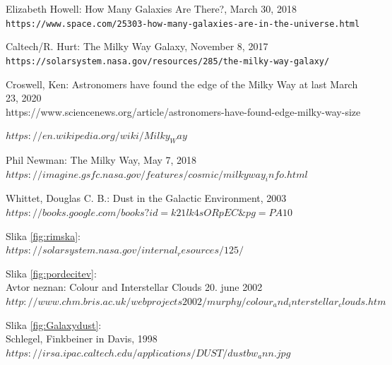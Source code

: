\documentclass[12pt, a4paper]{article}
\begin{document}
\pagebreak
\tableofcontents

\pagebreak
\listoffigures

\pagebreak
\begin{thebibliography}{9}
Elizabeth Howell: How Many Galaxies Are There?, March 30, 2018 \\
\texttt{https://www.space.com/25303-how-many-galaxies-are-in-the-universe.html}

Caltech/R. Hurt: The Milky Way Galaxy, November 8, 2017 \\
\texttt{https://solarsystem.nasa.gov/resources/285/the-milky-way-galaxy/}

Croswell, Ken: Astronomers have found the edge of the Milky Way at last March 23, 2020 \\
https://www.sciencenews.org/article/astronomers-have-found-edge-milky-way-size

\texttt{$https://en.wikipedia.org/wiki/Milky_Way$}

Phil Newman: The Milky Way, May 7, 2018 \\
\texttt{$https://imagine.gsfc.nasa.gov/features/cosmic/milkyway_info.html$}

Whittet, Douglas C. B.: Dust in the Galactic Environment, 2003 \\
\texttt{$https://books.google.com/books?id=k21lk4sORpEC\&pg=PA10$}

Slika \ref{fig:rimska}: \\
\texttt{$https://solarsystem.nasa.gov/internal_resources/125/$}

Slika \ref{fig:pordecitev}: \\
Avtor neznan: Colour and Interstellar Clouds 20. june 2002 \\
\texttt{$http://www.chm.bris.ac.uk/webprojects2002/murphy/colour_and_interstellar_clouds.htm$}

Slika \ref{fig:Galaxydust}: \\
Schlegel, Finkbeiner in Davis, 1998 \\
\texttt{$https://irsa.ipac.caltech.edu/applications/DUST/dustbw_ann.jpg$}
\end{thebibliography}
\end{document}
